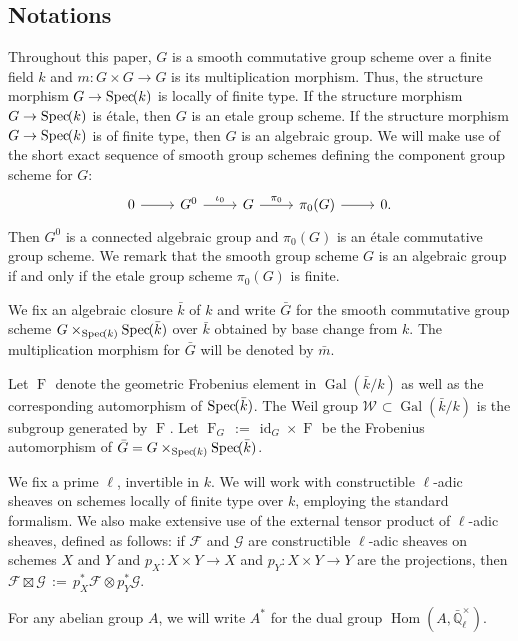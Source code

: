 \documentclass[10pt]{amsart}
\theoremstyle{plain}
\theoremstyle{definition}
\theoremstyle{remark}
\newcommand{\EE}{\mathbb{\bar Q}_\ell}
\newcommand{\bFq}{\bar{k}}
\newcommand{\Fq}{k}
\newcommand{\EEx}{\EE^\times}
\newcommand{\Weil}[1]{\mathcal{W}_{#1}}
\DeclareMathOperator{\Gal}{Gal}
\newcommand{\Frob}[1]{\operatorname{F}_{#1}}
\DeclareMathOperator{\Hom}{Hom}
\DeclareMathOperator{\id}{id}
\newcommand{\Spec}[1]{{\operatorname{Spec}\hskip-1pt( #1 )}}
\newcommand{\ceq}{{\, :=\, }}
\newcommand{\bm}{\bar{m}}
\newcommand{\bG}{\bar{G}}
\begin{document}
\subsection{Notations}\label{ssec:notation}

Throughout this paper, $G$ is a smooth commutative group scheme
over a finite field $\Fq$ and $m : G \times G\to G$ is its multiplication morphism.
Thus, the structure morphism $G \to \Spec{\Fq}$ is locally of finite type.
If the structure morphism $G \to \Spec{\Fq}$ is \'etale, then $G$ is an etale group scheme. 
If the structure morphism $G \to \Spec{\Fq}$ is of finite type, then $G$ is an algebraic group.
We will make use of the short exact sequence of smooth group schemes defining the component group scheme for $G$:
\[
\begin{tikzcd}
0 \rar & G^0 \arrow{r}{\iota_0} & G \arrow{r}{\pi_0} & \pi_0(G) \rar & 0.
\end{tikzcd}
\]
Then $G^0$ is a connected algebraic group and $\pi_0(G)$ is an \'etale commutative group scheme.
We remark that the smooth group scheme $G$ is an algebraic group if and only if the etale group scheme $\pi_0(G)$ is finite.
 
We fix an algebraic closure $\bFq$ of $\Fq$ and write $\bG$ for the
smooth commutative group scheme $G \times_{\Spec{\Fq}} \Spec{\bFq}$ over $\bFq$
obtained by base change from $k$. The multiplication morphism for $\bG$ will be denoted by $\bm$.

Let $\Frob{}$ denote the geometric Frobenius element in $\Gal(\bFq/\Fq)$ as
well as the corresponding automorphism of $\Spec{\bFq}$. The Weil group
$\Weil{}\subset \Gal(\bFq/\Fq)$ is the subgroup generated by $\Frob{}$.
Let $\Frob{G} \ceq \id_{G} \times \Frob{}$ be the Frobenius automorphism of $\bG = G \times_{\Spec{\Fq}} \Spec{\bFq}$.

We fix a prime $\ell$, invertible in $\Fq$.
We will work with constructible $\ell$-adic sheaves 
on schemes locally of finite type over $\Fq$, employing the standard formalism.
We also make extensive use of the external tensor product of $\ell$-adic sheaves,
defined as follows: if $\mathcal{F}$ and $\mathcal{G}$ are constructible $\ell$-adic
sheaves on schemes $X$ and $Y$ and $p_X : X\times Y\to X$ and $p_Y : X\times Y \to Y$
are the projections, then $\mathcal{F}\boxtimes \mathcal{G} \ceq p_X^* \mathcal{F} \otimes p_Y^*\mathcal{G}$.

For any abelian group $A$, we will write $A^*$ for the dual group $\Hom(A, \EEx)$.
\end{document}
